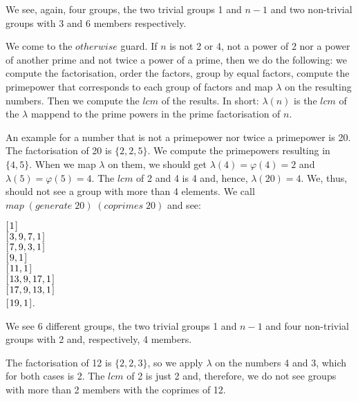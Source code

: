 \documentclass[tikz]{scrreprt}
\newcommand{\Varid}[1]{\mathit{#1}}
\begin{document}
We see, again, four groups,
the two trivial groups 1 and $n-1$ and
two non-trivial groups with 3 and 6 members respectively.

We come to the \ensuremath{\Varid{otherwise}} guard.
If $n$ is not 2 or 4, not a power of 2
nor a power of another prime and not
twice a power of a prime, then
we do the following: 
we compute the factorisation,
order the factors, group by equal factors,
compute the primepower that corresponds
to each group of factors and map $\lambda$
on the resulting numbers. Then we
compute the \ensuremath{\Varid{lcm}} of the results.
In short: $\lambda(n)$ is the \ensuremath{\Varid{lcm}}
of the $\lambda$ mappend to the prime powers
in the prime factorisation of $n$.

An example for a number that is not a primepower
nor twice a primepower is 20.
The factorisation of 20 is $\lbrace 2,2,5\rbrace$.
We compute the primepowers resulting in $\lbrace 4,5\rbrace$.
When we map $\lambda$ on them, we should
get $\lambda(4) = \varphi(4) = 2$ and
$\lambda(5) = \varphi(5) = 4$.
The \ensuremath{\Varid{lcm}} of 2 and 4 is 4 and, hence,
$\lambda(20) = 4$.
We, thus, should not see a group
with more than 4 elements. We call
\ensuremath{\Varid{map}\;(\Varid{generate}\;\mathrm{20})\;(\Varid{coprimes}\;\mathrm{20})} and see:

\begin{minipage}{\textwidth}
\ensuremath{[\mskip1.5mu \mathrm{1}\mskip1.5mu]}\\
\ensuremath{[\mskip1.5mu \mathrm{3},\mathrm{9},\mathrm{7},\mathrm{1}\mskip1.5mu]}\\
\ensuremath{[\mskip1.5mu \mathrm{7},\mathrm{9},\mathrm{3},\mathrm{1}\mskip1.5mu]}\\
\ensuremath{[\mskip1.5mu \mathrm{9},\mathrm{1}\mskip1.5mu]}\\
\ensuremath{[\mskip1.5mu \mathrm{11},\mathrm{1}\mskip1.5mu]}\\
\ensuremath{[\mskip1.5mu \mathrm{13},\mathrm{9},\mathrm{17},\mathrm{1}\mskip1.5mu]}\\
\ensuremath{[\mskip1.5mu \mathrm{17},\mathrm{9},\mathrm{13},\mathrm{1}\mskip1.5mu]}\\
\ensuremath{[\mskip1.5mu \mathrm{19},\mathrm{1}\mskip1.5mu]}.
\end{minipage}

We see 6 different groups, the two trivial groups
1 and $n-1$ and four non-trivial groups
with 2 and, respectively, 4 members.

The factorisation of 12 is $\lbrace 2,2,3\rbrace$,
so we apply $\lambda$ on the numbers
4 and 3, which for both cases is 2.
The \ensuremath{\Varid{lcm}} of 2 is just 2 and, therefore,
we do not see groups with more than 2 members
with the coprimes of 12.
\end{document}
